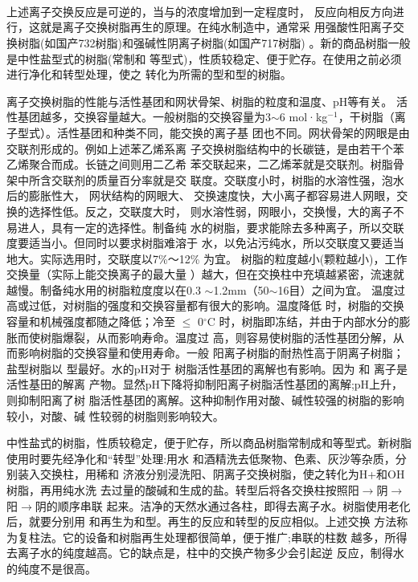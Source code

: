 {\centering
{}\\
\\
\\}

上述离子交换反应是可逆的，当与的浓度增加到一定程度时，
反应向相反方向进行，这就是离子交换树脂再生的原理。在纯水制造中，通常采
用强酸性阳离子交换树脂(如国产732树脂)和强碱性阴离子树脂(如国产717树脂)
。新的商品树脂一般是中性盐型式的树脂(常制和
等型式)，性质较稳定、便于贮存。在使用之前必须进行净化和转型处理，使之
转化为所需的型和型的树脂。

离子交换树脂的性能与活性基团和网状骨架、树脂的粒度和温度、pH等有关。
 活性基团越多，交换容量越大。一般树脂的交换容量为3$\sim$6
mol·kg$^{-1}$，干树脂（离子型式）。活性基团和种类不同，能交换的离子基
团也不同。网状骨架的网眼是由交联剂形成的。例如上述苯乙烯系离
子交换树脂结构中的长碳链，是由若干个苯乙烯聚合而成。长链之间则用二乙希
苯交联起来，二乙烯苯就是交联剂。树脂骨架中所含交联剂的质量百分率就是交
联度。交联度小时，树脂的水溶性强，泡水后的膨胀性大， 网状结构的网眼大、
交换速度快，大小离子都容易进人网眼，交换的选择性低。反之，交联度大时，
则水溶性弱，网眼小，交换慢，大的离子不易进人，具有一定的选择性。制备纯
水的树脂，要求能除去多种离子，所以交联度要适当小。但同时以要求树脂难溶于
水，以免沾污纯水，所以交联度又要适当地大。实际选用时，交联度以7\%～12\%
为宜。
树脂的粒度越小(颗粒越小)，工作交换量（实际上能交换离子的最大量
）越大，但在交换柱中充填越紧密，流速就越慢。制备纯水用的树脂粒度度以在0.3
$\sim$1.2mm（50$\sim$16目）之间为宜。
温度过高或过低，对树脂的强度和交换容量都有很大的影响。温度降低
时，树脂的交换容量和机械强度都随之降低；冷至 $\leqslant$ 0$^{\circ}\mathrm{C}$
时，树脂即冻结，并由于内部水分的膨胀而使树脂爆裂，从而影响寿命。温度过
高，则容易使树脂的活性基团分解，从而影响树脂的交换容量和使用寿命。一般
阳离子树脂的耐热性高于阴离子树脂；盐型树脂以 型最好。水的pH对于
树脂活性基团的离解也有影响。因为 和 离子是活性基田的解离
产物。显然pH下降将抑制阳离子树脂活性基团的离解;pH上升，则抑制阳离了树
脂活性基团的离解。这种抑制作用对酸、碱性较强的树脂的影响较小，对酸、碱
性较弱的树脂则影响较大。

中性盐式的树脂，性质较稳定，便于贮存，所以商品树脂常制成和等型式。新树脂使用时要先经净化和“转型”处理:用水
和酒精洗去低聚物、色素、灰沙等杂质，分别装入交换柱，用稀和
济液分别浸洗阳、阴离子交换树脂，使之转化为H+和OH树脂，再用纯水洗
去过量的酸碱和生成的盐。转型后将各交换柱按照阳$\rightarrow$阴$\rightarrow$阳$\rightarrow$阴的顺序串联
起来。洁净的天然水通过各柱，即得去离子水。树脂使用老化后，就要分别用
和再生为和型。再生的反应和转型的反应相似。上述交换
方法称为复柱法。它的设备和树脂再生处理都很简单，便于推广;串联的柱数
越多，所得去离子水的纯度越高。它的缺点是，柱中的交换产物多少会引起逆
反应，制得水的纯度不是很高。

